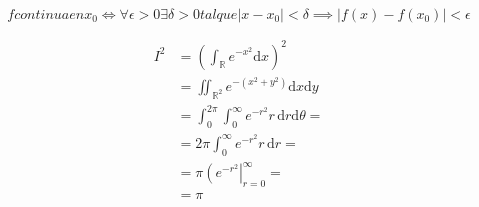 \documentclass[11pt, a4paper]{article}
\begin{document}
\[ f continua en x_0 \iff \forall \epsilon > 0 \exists \delta > 0 tal que |x - x_0| < \delta \implies |f(x) - f(x_0)| < \epsilon \]

\begin{align*} I^2 &=
	\left(\int_{\mathbb{R}} e^{-x^2} \mathrm{d}x\right)^2 \\
	&= \iint_{\mathbb{R}^2} e^{-(x^2+y^2)} \mathrm{d}x \mathrm{d}y \\
	&= \int_0^{2\pi} \int_{0}^\infty e^{-r^2} r\, \mathrm{d} r \mathrm{d} \theta = \\
	&= 2 \pi \int_{0}^\infty e^{-r^2} r\, \mathrm{d} r = \\
	&= \pi \left(e^{-r^2}\right|_{r = 0}^{\infty} = \\
	&= \pi
\end{align*}
\end{document}
